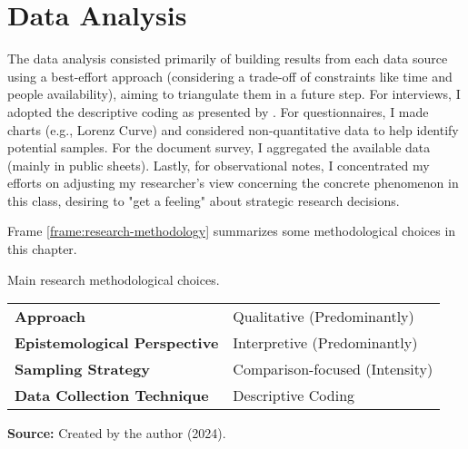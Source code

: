 \section{Data Analysis}
\label{res-met:data-analysis}

The data analysis consisted primarily of building results from each data source using a best-effort approach (considering a trade-off of constraints like time and people availability), aiming to triangulate them in a future step. For interviews, I adopted the descriptive coding as presented by . For questionnaires, I made charts (e.g., Lorenz Curve) and considered non-quantitative data to help identify potential samples. For the document survey, I aggregated the available data (mainly in public sheets). Lastly, for observational notes, I concentrated my efforts on adjusting my researcher's view concerning the concrete phenomenon in this class, desiring to "get a feeling" about strategic research decisions.

Frame \ref{frame:research-methodology} summarizes some methodological choices in this chapter.



\begin{quadro}[!htb]
\caption{Main research methodological choices.}
\label{frame:research-methodology}
\centering
\begin{tabular}{|l|l|}
\cline{1-2}

\textbf{Approach} & 
Qualitative (Predominantly) \\

\textbf{Epistemological Perspective} &
Interpretive (Predominantly)\\

\textbf{Sampling Strategy} &
Comparison-focused (Intensity)\\

\textbf{Data Collection Technique} &
Descriptive Coding \\
\hline

\end{tabular}
  \par\medskip\ABNTEXfontereduzida\selectfont\textbf{Source:} Created by the author (2024). \par\medskip
\end{quadro}

